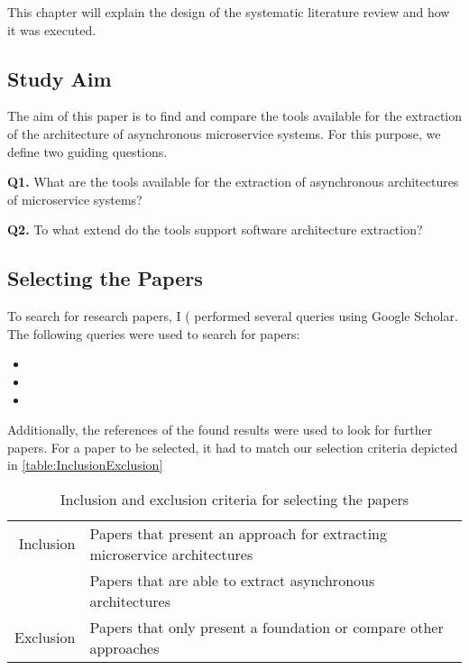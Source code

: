 This chapter will explain the design of the systematic literature review and how it was executed.

\subsection{Study Aim}
\label{sec:StudyDesign:StudyAim}
The aim of this paper is to find and compare the tools available for the extraction of the architecture of asynchronous microservice systems.
For this purpose, we define two guiding questions.

\textbf{Q1.} What are the tools available for the extraction of asynchronous architectures of microservice systems?

\textbf{Q2.} To what extend do the tools support software architecture extraction?

\subsection{Selecting the Papers}
\label{sec:StudyDesign:SelectingPapers}
To search for research papers, I ( performed several queries using Google Scholar.
The following queries were used to search for papers:
\begin{itemize}
	\item {}
	\item {}
	\item {}
\end{itemize}

Additionally, the references of the found results were used to look for further papers.
For a paper to be selected, it had to match our selection criteria depicted in \autoref{table:InclusionExclusion}


\begin{table}
\centering
\begin{tabular}{r l}
\toprule
Inclusion
& Papers that present an approach for extracting microservice architectures \\
& Papers that are able to extract asynchronous architectures \\
\midrule
Exclusion
& Papers that only present a foundation or compare other approaches \\
\bottomrule
\end{tabular}
\caption{Inclusion and exclusion criteria for selecting the papers}
\label{table:InclusionExclusion}
\end{table}


